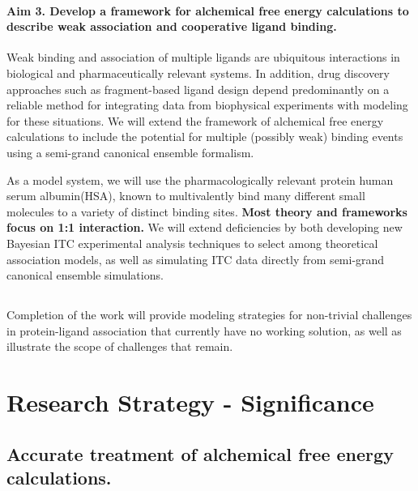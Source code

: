 \documentclass[10pt,final]{article}
\newif\ifinstr
\newcommand{\instr}[1]{\ifdraft{\ifinstr {\color{cyan}\emph{#1}} \fi}{}}
\begin{document}
\paragraph*{Aim 3. Develop a framework for alchemical free energy calculations to describe weak association and cooperative ligand binding.}
Weak binding and association of multiple ligands are ubiquitous interactions in biological and pharmaceutically relevant systems.
%
In addition, drug discovery approaches such as fragment-based ligand design depend predominantly on a reliable method for integrating data from biophysical experiments with modeling for these situations.
%
We will extend the framework of alchemical free energy calculations  to include the potential for multiple (possibly weak) binding events using a semi-grand canonical ensemble formalism.
%

As a model system, we will use the pharmacologically relevant protein human serum albumin(HSA), known to multivalently bind many different small molecules to a variety of distinct binding sites.
%
\textbf{Most theory and frameworks focus on 1:1 interaction.}
%
We will extend deficiencies by both developing new Bayesian ITC experimental analysis techniques to select among theoretical association models,
%
as well as simulating ITC data directly from semi-grand canonical ensemble simulations.

\subsection*{} %

Completion of the work will provide modeling strategies for non-trivial challenges in protein-ligand association that currently have no working solution, as well as illustrate the scope of challenges that remain.

\section*{Research Strategy - Significance}
\instr{General background, significance in terms of basic science and disease relevance.}

\subsection*{Accurate treatment of alchemical free energy calculations.}
\end{document}
